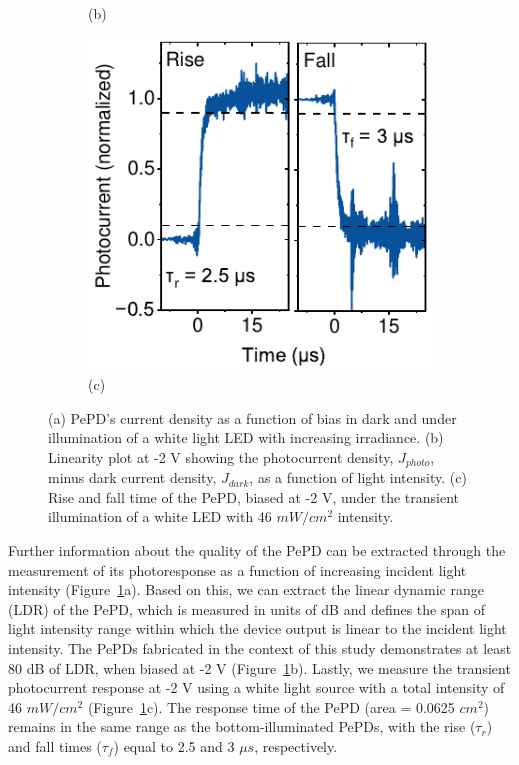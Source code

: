 \begin{figure}[htbp]
\begin{subfigure}[t]{0.29\textwidth}
        \caption*{(b)}
    \end{subfigure}
    \hfill
    \begin{subfigure}[t]{0.29\textwidth}
        \centering
        \includegraphics[width=\textwidth]{chapters/transport_layers/images/TPC_rise_fall.pdf} %
        \caption*{(c)}
    \end{subfigure}
    \caption{(a) PePD's current density as a function of bias in dark and under illumination of a white light LED with increasing irradiance. (b) Linearity plot at -2 V showing the photocurrent density, $J_{photo}$, minus dark current density, $J_{dark}$, as a function of light intensity. (c) Rise and fall time of the PePD, biased at -2 V, under the transient illumination of a white LED with 46 $mW/cm^2$ intensity.}
    \label{fig:etl:linearity_and_tpc}
\end{figure}

Further information about the quality of the PePD can be extracted through the measurement of its photoresponse as a function of increasing incident light intensity (Figure~\ref{fig:etl:linearity_and_tpc}a). Based on this, we can extract the linear dynamic range (LDR) of the PePD, which is measured in units of dB and defines the span of light intensity range within which the device output is linear to the incident light intensity. The PePDs fabricated in the context of this study demonstrates at least 80 dB of LDR, when biased at -2 V (Figure~\ref{fig:etl:linearity_and_tpc}b). Lastly, we measure the transient photocurrent response at -2 V using a white light source with a total intensity of 46 $mW/cm^2$ (Figure~\ref{fig:etl:linearity_and_tpc}c). The response time of the PePD (area = 0.0625 $cm^2$) remains in the same range as the bottom-illuminated PePDs, with the rise ($\tau_r$) and fall times ($\tau_f$) equal to 2.5 and 3 $\mu s$, respectively. 


